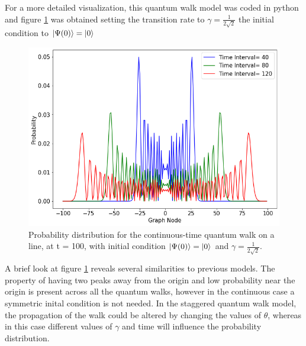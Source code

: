 \documentclass[../../dissertation.tex]{subfiles}
\begin{document}
For a more detailed visualization, this quantum walk model was coded in python
and figure \ref{fig:contdist0} was obtained setting the transition rate to
$\gamma=\frac{1}{2\sqrt{2}}$ the initial condition to $\ket{\Psi(0)} = \ket{0}$ 
\begin{figure}[!h]
	\centering
	\includegraphics[scale=0.40]{img/ContQuantumWalk/ctqwMultipleTime.png}
	\caption{Probability distribution for the continuous-time quantum walk on a line, at t = 100, with initial condition $\ket{\Psi(0)}=\ket{0}$ and $\gamma=\frac{1}{2\sqrt{2}}$.} 
	\label{fig:contdist0}
\end{figure}
A brief look at figure \ref{fig:contdist0} reveals several similarities to
previous models. The property of having two peaks away from the origin and low
probability near the origin is present across all the quantum walks, however in
the continuous case a symmetric inital condition is not needed. In the
staggered quantum walk model, the propagation of the walk could be altered by
changing the values of $\theta$, whereas in this case different values of
$\gamma$ and time will influence the probability distribution.\par
\end{document}
